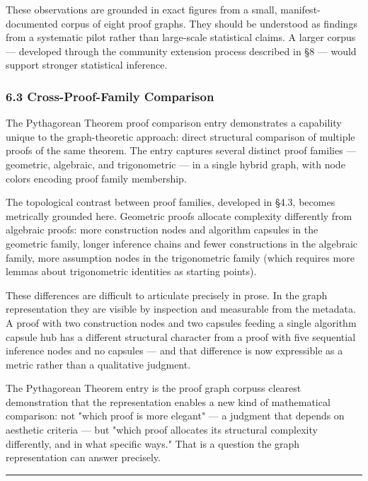 \documentclass[
  11pt]{article}
\begin{document}
These observations are grounded in exact figures from a small,
manifest-documented corpus of eight proof graphs. They should be
understood as findings from a systematic pilot rather than large-scale
statistical claims. A larger corpus --- developed through the community
extension process described in §8 --- would support stronger statistical
inference.

\hypertarget{63-cross-proof-family-comparison}{%
\subsubsection{6.3 Cross-Proof-Family
Comparison}\label{63-cross-proof-family-comparison}}

The Pythagorean Theorem proof comparison entry demonstrates a capability
unique to the graph-theoretic approach: direct structural comparison of
multiple proofs of the same theorem. The entry captures several distinct
proof families --- geometric, algebraic, and trigonometric --- in a
single hybrid graph, with node colors encoding proof family membership.

The topological contrast between proof families, developed in §4.3,
becomes metrically grounded here. Geometric proofs allocate complexity
differently from algebraic proofs: more construction nodes and algorithm
capsules in the geometric family, longer inference chains and fewer
constructions in the algebraic family, more assumption nodes in the
trigonometric family (which requires more lemmas about trigonometric
identities as starting points).

These differences are difficult to articulate precisely in prose. In the
graph representation they are visible by inspection and measurable from
the metadata. A proof with two construction nodes and two capsules
feeding a single algorithm capsule hub has a different structural
character from a proof with five sequential inference nodes and no
capsules --- and that difference is now expressible as a metric rather
than a qualitative judgment.

The Pythagorean Theorem entry is the proof graph
corpus\textquotesingle s clearest demonstration that the representation
enables a new kind of mathematical comparison: not "which proof is more
elegant" --- a judgment that depends on aesthetic criteria --- but
"which proof allocates its structural complexity differently, and in
what specific ways." That is a question the graph representation can
answer precisely.

\begin{center}\rule{0.5\linewidth}{0.5pt}\end{center}
\end{document}
